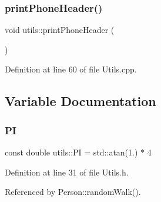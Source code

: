 \mbox{\label{namespaceutils_a7633a4dfe509a009f4e02850b03ba1e4}} 
\subsubsection{printPhoneHeader()}
{\footnotesize\ttfamily void utils\+::print\+Phone\+Header (\begin{DoxyParamCaption}{ }\end{DoxyParamCaption})}



Definition at line 60 of file Utils.\+cpp.



\subsection{Variable Documentation}
\mbox{\label{namespaceutils_a92ce7d254229929886551de7417e1912}} 
\subsubsection{PI}
{\footnotesize\ttfamily const double utils\+::\+PI = std\+::atan(1.) $\ast$ 4}



Definition at line 31 of file Utils.\+h.



Referenced by Person\+::random\+Walk().

